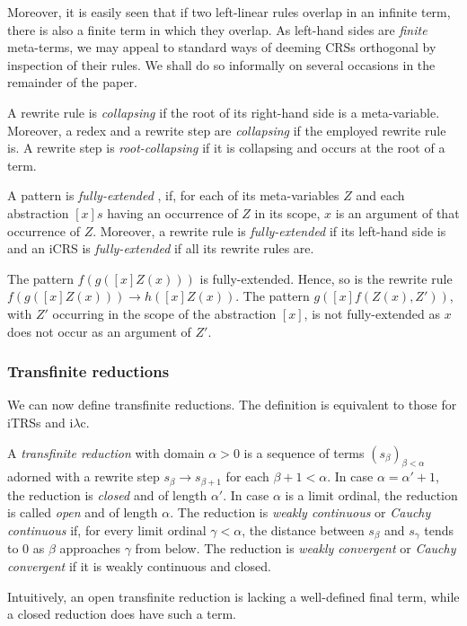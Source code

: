 \documentclass{LMCS}
\theoremstyle{plain}
\theoremstyle{definition}
\newcommand{\rew}{\rightarrow}
\newcommand{\iLC}{i$\lambda$c\xspace}
\begin{document}
Moreover, it is easily seen that if two left-linear rules overlap in an infinite term, there is also a finite term in which they overlap. As left-hand sides are
\emph{finite} meta-terms, we may appeal to standard ways of deeming
CRSs orthogonal by inspection of their rules.
We shall do so informally on several occasions in the
remainder of the paper. 




\begin{defi}
A rewrite rule is \emph{collapsing} if the root of its right-hand side is a meta-variable. 
Moreover, a redex and a rewrite step are \emph{collapsing}
if the employed rewrite rule is. A rewrite step is \emph{root-collapsing}
if it is collapsing and occurs at the root of a term.
\end{defi}

\begin{defi}
\label{def:fully_extended}
A pattern is \emph{fully-extended} \cite{HP96,O96}, if, for each of
its meta-variables $Z$ and each abstraction $[x]s$ having an
occurrence of $Z$ in its scope, $x$ is an argument of that occurrence
of $Z$. Moreover, a rewrite rule is \emph{fully-extended} if its
left-hand side is and an iCRS is \emph{fully-extended} if all its
rewrite rules are.
\end{defi}

\begin{exa}
The pattern $f(g([x]Z(x)))$ is fully-extended. Hence, so is the rewrite
rule $f(g([x]Z(x))) \rightarrow h([x]Z(x))$. The pattern $g([x]f(Z(x),Z'))$, with $Z'$ occurring in the scope of the abstraction $[x]$, is not fully-extended as $x$ does not occur as an argument of $Z'$.
\end{exa}



\subsubsection{Transfinite reductions}

We can now define transfinite reductions.
The definition is equivalent to those for iTRSs and \iLC \cite{KKSV95,KKSV97}.
\begin{defi}
A \emph{transfinite reduction} with domain $\alpha > 0$ is a sequence
of terms $(s_\beta)_{\beta < \alpha}$ adorned with a rewrite step
$s_\beta \rew s_{\beta + 1}$ for each $\beta + 1 < \alpha$. In case $\alpha = \alpha' + 1$,
the reduction is \emph{closed} and of length $\alpha'$. In case
$\alpha$ is a limit ordinal, the reduction is called \emph{open} and
of length $\alpha$. The reduction is \emph{weakly continuous} or
\emph{Cauchy continuous} if, for every limit ordinal $\gamma < \alpha$, the distance between $s_\beta$ and $s_\gamma$ tends to $0$ as $\beta$ approaches $\gamma$ from below. The reduction is \emph{weakly convergent} or \emph{Cauchy convergent} if it is weakly continuous and closed.
\end{defi}
\noindent Intuitively, an open transfinite reduction is lacking a well-defined final term, while a closed reduction does have such a term. 
\end{document}
